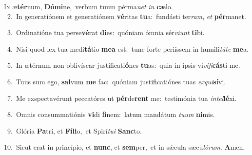 \lettrine{\initial\textcolor{\initialcolor}{I}}{n} æ\-\textbf{tér}\-num, \textbf{Dó}\-\textbf{mi}ne,~\star verbum tuum pérma\textit{net} \textit{in} \textbf{cæ}\-lo.\\
{\numbfont\textcolor{\numbcolor}{~2.}}~In generatiónem et generatiónem \textbf{vé}\-ritas \textbf{tu}\-a:~\star fundásti ter\-\textit{ram}\-, \textit{et} \textbf{pér}\-manet.\par
{\numbfont\textcolor{\numbcolor}{~3.}}~Ordinatióne tua perse\-\textbf{vé}\-rat \textbf{di}\-es:~\star quóniam ómnia sér\-\textit{vi}\-\textit{unt} \textbf{ti}\-bi.\par
{\numbfont\textcolor{\numbcolor}{~4.}}~Nisi quod lex tua medi\-\textbf{tá}\-tio \textbf{me}\-\textbf{a} est:~\star tunc forte periíssem in humili\-\textit{tá}\-\textit{te} \textbf{me}\-a.\par
{\numbfont\textcolor{\numbcolor}{~5.}}~In ætérnum non oblivíscar justificati\-\textbf{ó}\-nes \textbf{tu}\-as:~\star quia in ipsis vi\-\textit{vi}\-\textit{fi}\textbf{cás}ti me.\par
{\numbfont\textcolor{\numbcolor}{~6.}}~Tuus sum ego, \textbf{sal}\-vum \textbf{me} fac:~\star quóniam justificatiónes tuas \textit{ex}\-\textit{qui}\textbf{sí}vi.\par
{\numbfont\textcolor{\numbcolor}{~7.}}~Me exspectavérunt peccatóres ut \textbf{pér}\-de\textbf{rent} me:~\star testimónia tua \textit{in}\-\textit{tel}\textbf{lé}xi.\par
{\numbfont\textcolor{\numbcolor}{~8.}}~Omnis consummatiónis \textbf{vi}\-di \textbf{fi}\-nem:~\star latum mandátum \textit{tu}\-\textit{um} \textbf{ni}\-mis.\par
{\numbfont\textcolor{\numbcolor}{~9.}}~Glória \textbf{Pa}\-tri, et \textbf{Fí}\-\textbf{li}o,~\star et Spirí\-\textit{tu}\-\textit{i} \textbf{Sanc}\-to.\par
{\numbfont\textcolor{\numbcolor}{10.}}~Sicut erat in princípio, et \textbf{nunc}\-, et \textbf{sem}\-per,~\star et in sǽcula sæcu\-\textit{ló}\-\textit{rum}. \textbf{A}\-men.\par
